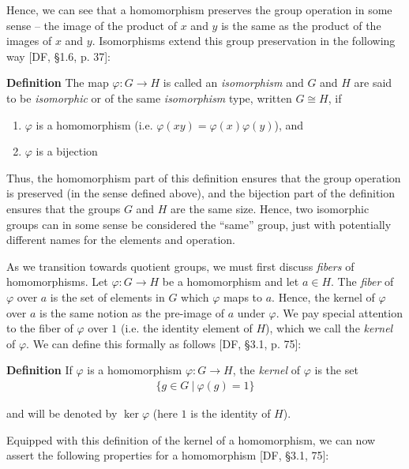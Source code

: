 \documentclass[11pt, reqno]{amsart}
\theoremstyle{plain}
\theoremstyle{definition}
\theoremstyle{example}
\begin{document}
\par
Hence, we can see that a homomorphism preserves the group operation in some sense -- the image of the product of $x$ and $y$ is the same as the product of the images of $x$ and $y$. Isomorphisms extend this group preservation in the following way [DF, \S 1.6, p. 37]:

\par
\textbf{Definition} The map $\varphi: G \to H$ is called an \textit{isomorphism} and $G$ and $H$ are said to be \textit{isomorphic} or of the same \textit{isomorphism} type, written $G \cong H$, if
\begin{enumerate}
\item $\varphi$ is a homomorphism (i.e. $\varphi(xy) = \varphi(x)\varphi(y)$), and
\item $\varphi$ is a bijection
\end{enumerate}

\par
Thus, the homomorphism part of this definition ensures that the group operation is preserved (in the sense defined above), and the bijection part of the definition ensures that the groups $G$ and $H$ are the same size. Hence, two isomorphic groups can in some sense be considered the ``same'' group, just with potentially different names for the elements and operation.

\par
As we transition towards quotient groups, we must first discuss \textit{fibers} of homomorphisms. Let $\varphi: G \to H$ be a homomorphism and let $a \in H$. The \textit{fiber} of $\varphi$ over $a$ is the set of elements in $G$ which $\varphi$ maps to $a$. Hence, the kernel of $\varphi$ over $a$ is the same notion as the pre-image of $a$ under $\varphi$. We pay special attention to the fiber of $\varphi$ over $1$ (i.e. the identity element of $H$), which we call the \textit{kernel} of $\varphi$. We can define this formally as follows [DF, \S 3.1, p. 75]:

\par
\textbf{Definition} If $\varphi$ is a homomorphism $\varphi: G \to H$, the \textit{kernel} of $\varphi$ is the set
\begin{align*}
\{g \in G \ | \ \varphi(g) = 1\}
\end{align*}

and will be denoted by $\ker \varphi$ (here $1$ is the identity of $H$).

\par
Equipped with this definition of the kernel of a homomorphism, we can now assert the following properties for a homomorphism [DF, \S 3.1, 75]:
\end{document}
